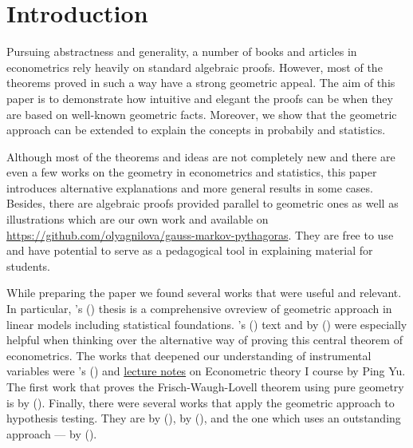 \section{Introduction}

\begin{fullwidth}

Pursuing abstractness and generality, a number of books and articles in
econometrics rely heavily on standard algebraic proofs.
However, most of the theorems proved in such a way have a strong geometric appeal.
The aim of this paper is to demonstrate how intuitive and elegant the proofs
can be when they are based on well-known geometric facts.
Moreover, we show that the geometric approach can be extended to explain
the concepts in probabily and statistics.

Although most of the theorems and ideas are not completely new and
there are even a few works on the geometry in econometrics and statistics,
this paper introduces alternative explanations and more general results in some cases.
Besides, there are algebraic proofs provided parallel to geometric ones
as well as illustrations which are our own work and available on \url{https://github.com/olyagnilova/gauss-markov-pythagoras}. %
They are free to use and have potential to serve as a pedagogical tool
in explaining material for students.

While preparing the paper we found several works that were useful and relevant.
In particular, \citeauthor{jacobson}'s (\citeyear{jacobson}) thesis 
is a comprehensive ovreview of geometric approach in linear models including
statistical foundations.
\citeauthor{gmt_blue}’s (\citeyear{gmt_blue}) text  and
 by
\citeauthor{gmt_american_statistician} (\citeyear{gmt_american_statistician}) were especially helpful when thinking over
the alternative way of proving this central theorem of econometrics.
The works that deepened our understanding of instrumental variables were
\citeauthor{Butler2016}'s (\citeyear{Butler2016}) 
and \href{http://web.hku.hk/~pingyu/6005/6005.htm}{lecture notes} on Econometric theory I course by Ping Yu.
The first work that proves the Frisch-Waugh-Lovell theorem using pure geometry
is  by
\citeauthor{fwl} (\citeyear{fwl}).
Finally, there were several works that apply the geometric approach to
hypothesis testing. They are
by \citeauthor{Langsrud2004} (\citeyear{Langsrud2004}),
by \citeauthor{Siniksaran2005} (\citeyear{Siniksaran2005}),
and the one which uses an outstanding approach —
by \citeauthor{friendly2013} (\citeyear{friendly2013}).


\end{fullwidth}
